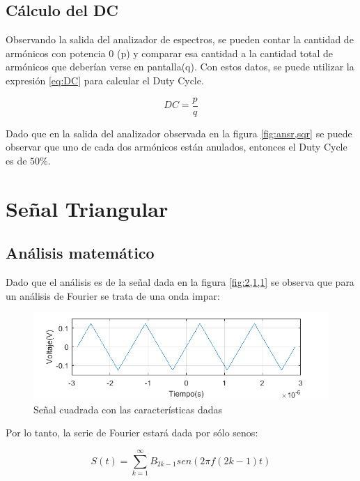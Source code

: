     \subsection{Cálculo del DC}
    Observando la salida del analizador de espectros, se pueden contar la cantidad 
    de armónicos con potencia 0 (p) y comparar esa cantidad a la cantidad total de
    armónicos que deberían verse en pantalla(q). Con estos datos, se puede utilizar
    la expresión \ref{eq:DC} para calcular el Duty Cycle.

    \begin{equation}
        DC = \frac{p}{q}
        \label{eq:DC}
    \end{equation}

    Dado que en la salida del analizador observada en la figura \ref{fig:ansr,sqr}
    se puede observar que uno de cada dos armónicos están anulados, entonces el
    Duty Cycle es de $50 \%$.

\section{Señal Triangular}
    \subsection{Análisis matemático}

    Dado que el análisis es de la señal dada en la figura \ref{fig:2,1,1}
    se observa que para un análisis de Fourier se trata de una onda
    impar:

    \begin{figure}[ht]
        \begin{center}
            \includegraphics[width=\linewidth]{contenido/img/sig_tri.png}
            \caption{Señal cuadrada con las características dadas}
            \label{fig:2,2,1}
        \end{center}
    \end{figure}

    Por lo tanto, la serie de Fourier estará dada por sólo senos:

    \begin{equation}
        S(t) = \sum_{k=1}^{\infty} B_{2k-1} sen(2 \pi f (2k-1) t)
    \end{equation}

